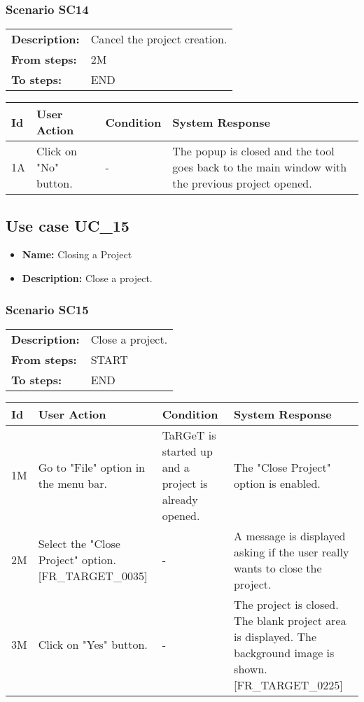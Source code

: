 \documentclass[a4paper,11pt]{article}
\newcommand{\bl}{\\ \hline}
\begin{document}
\subsubsection*{Scenario SC14}
\begin{tabular}{p{1in}p{4in}}
{\bf Description:} & Cancel the project creation. \\
{\bf From steps:} & 2M \\
{\bf To steps:} & END \\
\end{tabular}
 
\begin{tabular}{|p{0.8in}|p{1.6in}|p{1.6in}|p{1.6in}|}
\hline
Id & User Action & Condition & System Response  \bl 
1A & Click on "No" button. & - & The popup is closed and the tool goes back to the main
						window with the previous project opened. \bl 
\end{tabular}
\subsection*{Use case UC_15}
\begin{itemize}
\item {\bf Name: }Closing a Project
\item {\bf Description: }Close a project.
\end{itemize}
\subsubsection*{Scenario SC15}
\begin{tabular}{p{1in}p{4in}}
{\bf Description:} & Close a project. \\
{\bf From steps:} & START \\
{\bf To steps:} & END \\
\end{tabular}
 
\begin{tabular}{|p{0.8in}|p{1.6in}|p{1.6in}|p{1.6in}|}
\hline
Id & User Action & Condition & System Response  \bl 
1M & Go to "File" option in the menu bar.   & TaRGeT is started up and a project is already opened.
					 & The "Close Project" option is enabled.  \bl 
2M & Select the "Close Project" option. [FR_TARGET_0035]
					 & - & A message is displayed asking if the user really wants to
						close the project.  \bl 
3M & Click on "Yes" button. & - & The project is closed. The blank project area is
						displayed. The background image is shown. [FR_TARGET_0225]
					 \bl 
\end{tabular}
\end{document}
